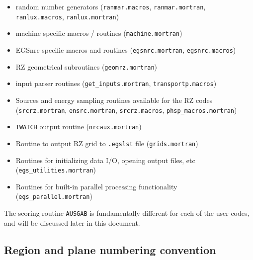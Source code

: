 \documentclass[12pt,twoside]{article}  %
\begin{document}
\begin{itemize}
\item{random number generators (\verb+ranmar.macros+,
\verb+ranmar.mortran+,\\
\verb+ranlux.macros+, \verb+ranlux.mortran+)}

\item{machine specific macros / routines
(\verb+machine.mortran+)}

\item{EGSnrc specific macros and routines
(\verb+egsnrc.mortran+, \verb+egsnrc.macros+)}

\item{RZ geometrical subroutines
(\verb+geomrz.mortran+)}

\item{input parser routines
(\verb+get_inputs.mortran+, {\tt transportp.macros})}

\item{Sources and energy sampling routines available for the RZ codes
(\verb+srcrz.mortran+, \verb+ensrc.mortran+, {\tt srcrz.macros},
{\tt phsp\_macros.mortran})}

\item{{\tt IWATCH} output routine
(\verb+nrcaux.mortran+)}

\item{Routine to output RZ grid to {\tt .egslst} file ({\tt grids.mortran})}

\item{Routines for initializing data I/O, opening output files, etc
({\tt egs\_utilities.mortran})}

\item{Routines for built-in parallel processing functionality
({\tt egs\_parallel.mortran})}

\end{itemize}
The scoring routine \verb+AUSGAB+ is fundamentally different for each
of the user codes, and will be discussed later in this document.

\newpage
\subsection{Region and plane numbering convention}
    
\end{document}
